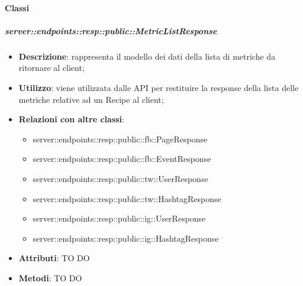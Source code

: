 	\paragraph{Classi} %

    \subparagraph{server::endpoints::resp::public::MetricListResponse} %
    \label{subp:bdsm_app_server_endpoints_resp_public_metriclistresponse}
    \begin{itemize}
      \item \textbf{Descrizione}: rappresenta il modello dei dati della lista di metriche da ritornare al client;
      \item \textbf{Utilizzo}: viene utilizzata dalle API per restituire la response della lista delle metriche relative ad un Recipe al client;
      \item \textbf{Relazioni con altre classi}:
        \begin{itemize}
          \item server::endpoints::resp::public::fb::PageResponse
          \item server::endpoints::resp::public::fb::EventResponse
          \item server::endpoints::resp::public::tw::UserResponse
          \item server::endpoints::resp::public::tw::HashtagResponse
          \item server::endpoints::resp::public::ig::UserResponse
          \item server::endpoints::resp::public::ig::HashtagResponse
        \end{itemize}
		\item \textbf{Attributi}: TO DO
		\item \textbf{Metodi}: TO DO
      \end{itemize}

